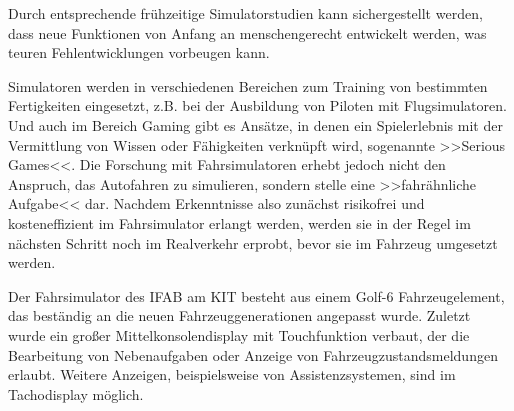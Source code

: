 \newpage




Durch entsprechende frühzeitige Simulatorstudien kann sichergestellt werden, dass neue Funktionen von Anfang an menschengerecht entwickelt werden, was teuren Fehlentwicklungen vorbeugen kann. 



Simulatoren werden in verschiedenen Bereichen zum Training von bestimmten Fertigkeiten eingesetzt, z.B. bei der Ausbildung von Piloten mit Flugsimulatoren. Und auch im Bereich Gaming gibt es Ansätze, in denen ein Spielerlebnis mit der Vermittlung von Wissen oder Fähigkeiten verknüpft wird, sogenannte >>Serious Games<<. Die Forschung mit Fahrsimulatoren erhebt jedoch nicht den Anspruch, das Autofahren zu simulieren, sondern stelle eine >>fahrähnliche Aufgabe<< dar. Nachdem Erkenntnisse also zunächst risikofrei und kosteneffizient im Fahrsimulator erlangt werden, werden sie in der Regel im nächsten Schritt noch im Realverkehr erprobt, bevor sie im Fahrzeug umgesetzt werden.



\pagecolor{white} %



Der Fahrsimulator des IFAB am KIT besteht aus einem Golf-6 Fahrzeugelement, das beständig an die neuen Fahrzeuggenerationen angepasst wurde. Zuletzt wurde ein großer Mittelkonsolendisplay mit Touchfunktion verbaut, der die Bearbeitung von Nebenaufgaben oder Anzeige von Fahrzeugzustandsmeldungen erlaubt. Weitere Anzeigen, beispielsweise von Assistenzsystemen, sind im Tachodisplay möglich.


